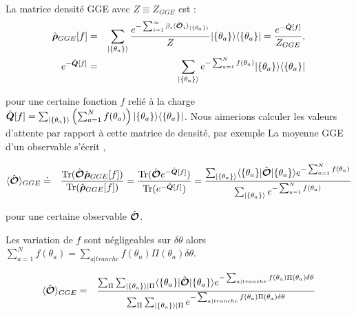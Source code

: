 La matrice densité GGE avec $Z \equiv Z_{GGE}$ est :
	\begin{eqnarray}
		\hat{\bm{\rho}}_{GGE}[f] & = & \sum_{\vert \{\theta_a \} \rangle }\frac{e^{-\sum_{i = 1}^\infty  \beta_i \langle \hat{\bm{\mathcal{O}}}_i \rangle_{\vert \{\theta_a \} \rangle} }}{Z} \vert \{\theta_a \}  \rangle   	\langle \{\theta_a \} \vert = \frac{e^{-\hat{\bm{Q}}[f]}}{Z_{GGE}}, \\
		e^{-\hat{\bm{Q}}[f]} & = & 	\sum_{\vert \{\theta_a \} \rangle } e^{- \sum_{a = 1}^N f(\theta_a) } \vert \{ \theta_a\} \rangle \langle  \{ \theta_a\}  \vert 
	\end{eqnarray}
	
	pour une certaine fonction $f$ relié à la charge $\hat{\bm{Q}} [f]  = \sum_{\vert \{\theta_a \} \rangle } \left ( \sum_{a = 1}^N f ( \theta_a )  \right ) \vert \{ \theta_a \} \rangle \langle \{ \theta_a \} \vert $. Nous aimerions calculer les valeurs d'attente par rapport à cette matrice de densité, par exemple
	La moyenne GGE d'un observable s'écrit ,
	
	\begin{eqnarray}
		\langle \hat{\bm{\mathcal{O}}} \rangle_{GGE} & \doteq & \displaystyle  \frac{\text{Tr} (\hat{\bm{\mathcal{O}}}\hat{\bm{\rho}}_{GGE}[f])}{\text{Tr} (\hat{\bm{\rho}}_{GGE}[f])} = \frac{\text{Tr} (\hat{\bm{\mathcal{O}}}e^{-\hat{\bm{Q}}[f]})}{\text{Tr} (e^{-\hat{\bm{Q}}[f]})}	 = \frac{ \sum_{\vert \{\theta_a \}\rangle} \langle  \{ \theta_a\}  \vert   \hat{\bm{\mathcal{O}}} \vert \{ \theta_a\} \rangle e^{- \sum_{a = 1}^N f(\theta_a) }  }{\sum_{\vert  \{\theta_a  \} \rangle} e^{- \sum_{a = 1}^N  f(\theta_a) } }
	\end{eqnarray}
		
	pour une certaine observable $\hat{\bm{\mathcal{O}}}$.
	
	Les variation de $f$ sont négligeables sur $\delta \theta $ alors  $\sum_{a = 1}^N  f(\theta_a) = \sum_{a \vert tranche } f(\theta_a) \Pi( \theta_a)\delta \theta$.
	
	
	\begin{eqnarray}
		\langle \hat{\bm{\mathcal{O}}} \rangle_{GGE} & =  & \frac{ \sum_{\Pi} \sum_{\vert \{\theta_a \}\rangle \vert \Pi } \langle  \{ \theta_a\}  \vert   \hat{\bm{\mathcal{O}}} \vert \{ \theta_a\} \rangle e^{- \sum_{a \vert tranche} f(\theta_a) \Pi ( \theta_a )  \delta \theta}    }{\sum_{\Pi} \sum_{\vert \{\theta_a \}\rangle \vert \Pi }  e^{- \sum_{a \vert tranche }  f(\theta_a) \Pi ( \theta_a ) \delta \theta } }
	\end{eqnarray}
	
